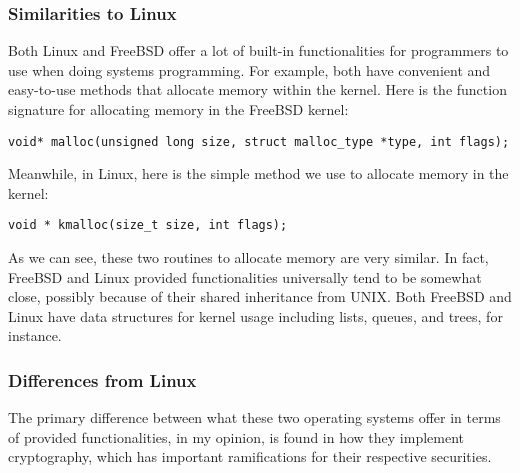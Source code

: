 \documentclass[letterpaper,10pt,titlepage]{article}
\begin{document}
\subsubsection{Similarities to Linux}
Both Linux and FreeBSD offer a lot of built-in functionalities for programmers to use when doing systems programming. For example, both have convenient and easy-to-use methods that allocate memory within the kernel. Here is the function signature for allocating memory in the FreeBSD kernel:
\begin{lstlisting}
void* malloc(unsigned long size, struct malloc_type *type, int flags);
\end{lstlisting}
Meanwhile, in Linux, here is the simple method we use to allocate memory in the kernel: \cite{linux}
\begin{lstlisting}
void * kmalloc(size_t size, int flags);
\end{lstlisting}
As we can see, these two routines to allocate memory are very similar. In fact, FreeBSD and Linux provided functionalities universally tend to be somewhat close, possibly because of their shared inheritance from UNIX. Both FreeBSD and Linux have data structures for kernel usage including lists, queues, and trees, for instance. 
\subsubsection{Differences from Linux}
The primary difference between what these two operating systems offer in terms of provided functionalities, in my opinion, is found in how they implement cryptography, which has important ramifications for their respective securities. 

\newpage
{}

\end{document}

